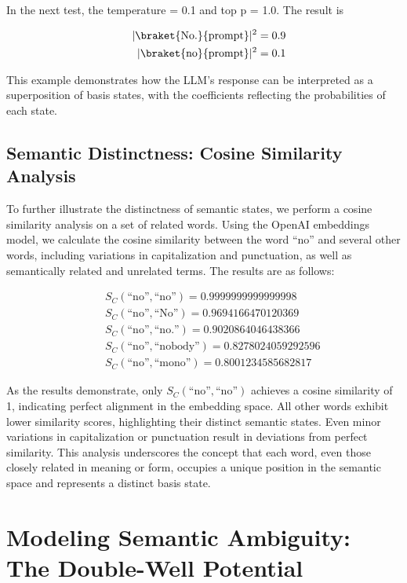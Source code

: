 \documentclass[prd,amsmath,amssymb,12pt]{revtex4}
\begin{document}
\noindent
In the next test, the temperature = 0.1 and top p = 1.0. The result is

\begin{eqnarray}
    &&|\braket{\text{No.}}{\text{prompt}}|^2 = 0.9 \\
    &&|\braket{\text{no}}{\text{prompt}}|^2 = 0.1
\end{eqnarray}

\noindent
This example demonstrates how the LLM's response can be interpreted as a superposition of basis states,
with the coefficients reflecting the probabilities of each state.

\subsection{Semantic Distinctness: Cosine Similarity Analysis}

To further illustrate the distinctness of semantic states, we perform a cosine similarity
analysis on a set of related words. Using the OpenAI embeddings model, we calculate the cosine
similarity between the word ``no'' and several other words, including variations in capitalization
and punctuation, as well as semantically related and unrelated terms. The results are as follows:

\begin{eqnarray}
    &&S_C(\text{``no''},\text{``no''}) =  0.9999999999999998 \\
    &&S_C(\text{``no''},\text{``No''}) =  0.9694166470120369 \\
    &&S_C(\text{``no''},\text{``no.''}) =  0.9020864046438366 \\
    &&S_C(\text{``no''},\text{``nobody''}) =  0.8278024059292596 \\
    &&S_C(\text{``no''},\text{``mono''}) =  0.8001234585682817
\end{eqnarray}

\noindent
As the results demonstrate, only $S_C(\text{``no''},\text{``no''})$ achieves a cosine similarity of 1,
indicating perfect alignment in the embedding space. All other words exhibit lower similarity scores,
highlighting their distinct semantic states. Even minor variations in capitalization or punctuation
result in deviations from perfect similarity. This analysis underscores the concept that each word,
even those closely related in meaning or form, occupies a unique position in the semantic space and
represents a distinct basis state.


\section{Modeling Semantic Ambiguity: The Double-Well Potential}
\end{document}

